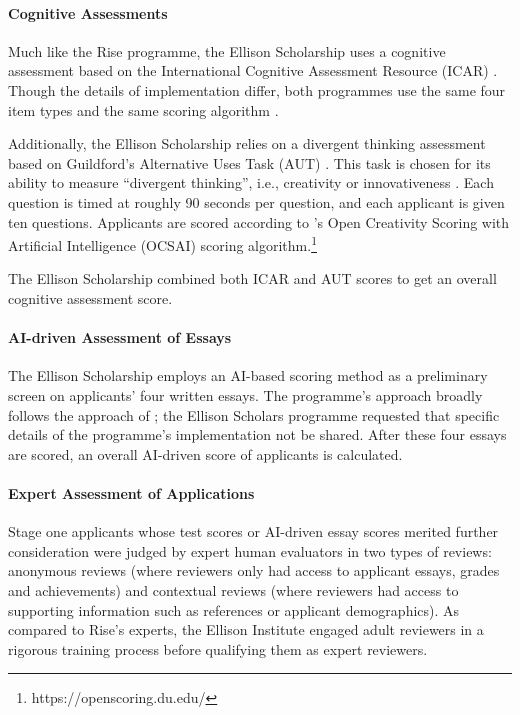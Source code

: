 \paragraph{Cognitive Assessments} 
Much like the Rise programme, the Ellison Scholarship uses a cognitive assessment based on the International Cognitive Assessment Resource (ICAR) \cite{condon2014international,subotic2020psychometric}. Though the details of implementation differ, both programmes use the same four item types and the same scoring algorithm \cite{burkner2021bayesian}.

Additionally, the Ellison Scholarship relies on a divergent thinking assessment based on Guildford's Alternative Uses Task (AUT) \cite{guilford1967creativity}. This task is chosen for its ability to measure ``divergent thinking'', i.e., creativity or innovativeness \cite{dumas_measuring_2020,organisciak_beyond_2023}. Each question is timed at roughly 90 seconds per question, and each applicant is given ten questions. Applicants are scored according to \textcite{organisciak_beyond_2023}'s Open Creativity Scoring with Artificial Intelligence (OCSAI) scoring algorithm.\footnote{https://openscoring.du.edu/}

The Ellison Scholarship combined both ICAR and AUT scores to get an overall cognitive assessment score.

\paragraph{AI-driven Assessment of Essays}
The Ellison Scholarship employs an AI-based scoring method as a preliminary screen on applicants' four written essays. The programme's approach broadly follows the approach of \textcite{xiao2024humanaicollaborativeessayscoring}; the Ellison Scholars programme requested that specific details of the programme's implementation not be shared. After these four essays are scored, an overall AI-driven score of applicants is calculated.

\paragraph{Expert Assessment of Applications}
Stage one applicants whose test scores or AI-driven essay scores merited further consideration were judged by expert human evaluators in two types of reviews: anonymous reviews (where reviewers only had access to applicant essays, grades and achievements) and contextual reviews (where reviewers had access to supporting information such as references or applicant demographics). As compared to Rise's experts, the Ellison Institute engaged adult reviewers in a rigorous training process before qualifying them as expert reviewers.

